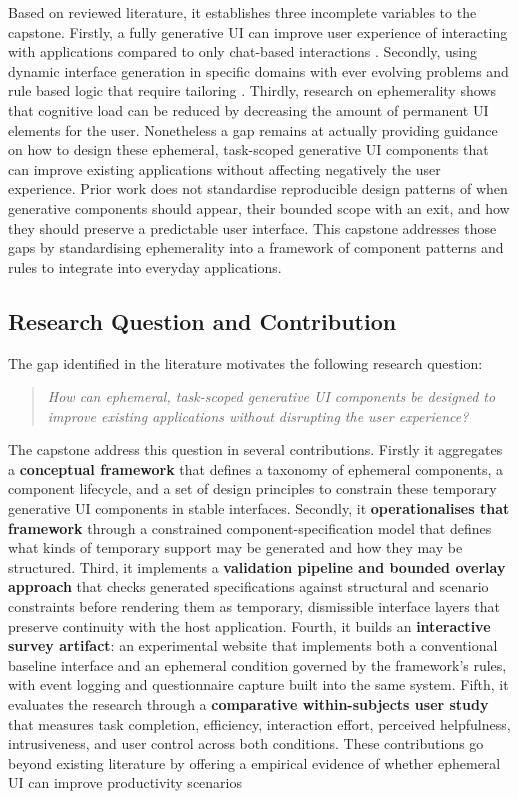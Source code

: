 Based on reviewed literature, it establishes three incomplete variables to the capstone. Firstly, a fully generative UI can improve user experience of interacting with applications compared to only chat-based interactions \parencite{Leviathan2025GenerativeUI,Tang2025SurveyGUI}. Secondly, using dynamic interface generation in specific domains with ever evolving problems and rule based logic that require tailoring \parencite{Tambi2020GenerativeBanking}. Thirdly, research on ephemerality shows that cognitive load can be reduced by decreasing the amount of permanent UI elements for the user. Nonetheless a gap remains at actually providing guidance on how to design these ephemeral, task-scoped generative UI components that can improve existing applications without affecting negatively the user experience. Prior work does not standardise reproducible design patterns of when generative components should appear, their bounded scope with an exit, and how they should preserve a predictable user interface. This capstone addresses those gaps by standardising ephemerality into a framework of component patterns and rules to integrate into everyday applications.

\subsection{Research Question and Contribution}

The gap identified in the literature motivates the following research question:

\begin{quote}
\emph{How can ephemeral, task-scoped generative UI components be designed to improve existing applications without disrupting the user experience?}
\end{quote}

The capstone address this question in several contributions. Firstly it aggregates a \textbf{conceptual framework} that defines a taxonomy of ephemeral components, a component lifecycle, and a set of design principles to constrain these temporary generative UI components in stable interfaces. Secondly, it \textbf{operationalises that framework} through a constrained component-specification model that defines what kinds of temporary support may be generated and how they may be structured. Third, it implements a \textbf{validation pipeline and bounded overlay approach} that checks generated specifications against structural and scenario constraints before rendering them as temporary, dismissible interface layers that preserve continuity with the host application. Fourth, it builds an \textbf{interactive survey artifact}: an experimental website that implements both a conventional baseline interface and an ephemeral condition governed by the framework's rules, with event logging and questionnaire capture built into the same system. Fifth, it evaluates the research through a \textbf{comparative within-subjects user study} that measures task completion, efficiency, interaction effort, perceived helpfulness, intrusiveness, and user control across both conditions. These contributions go beyond existing literature by offering a empirical evidence of whether ephemeral UI can improve productivity scenarios

